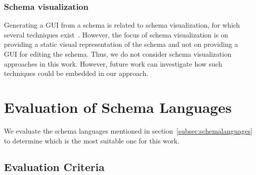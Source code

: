 \subsubsection{Schema visualization}\label{subsubsec:schema-visualization}
Generating a GUI from a schema is related to schema visualization, for which several techniques exist~\cite{Frasincar2006, SILVA201928, 10.1145/1317353.1317362, 1173142}.
However, the focus of schema visualization is on providing a static visual representation of the schema
and not on providing a GUI for editing the schema.
Thus, we do not consider schema visualization approaches in this work.
However, future work can investigate how such techniques could be embedded in our approach.


\section{Evaluation of Schema Languages}\label{sec:evaluation-of-schema-languages}


We evaluate the schema languages mentioned in section~\ref{subsec:schemalanguages} to determine which is the most suitable one for this work.


\subsection{Evaluation Criteria}\label{subsec:evaluation-criteria} %

